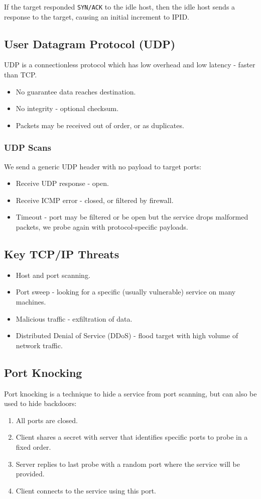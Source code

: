 \documentclass[11pt]{article}
\begin{document}
If the target responded \texttt{SYN/ACK} to the idle host, then the idle host sends a response to the target, causing an initial increment to IPID.

\subsection{User Datagram Protocol (UDP)}
UDP is a connectionless protocol which has low overhead and low latency - faster than TCP.
\begin{itemize}
  \item No guarantee data reaches destination.
  \item No integrity - optional checksum.
  \item Packets may be received out of order, or as duplicates.
\end{itemize}

\subsubsection{UDP Scans}
We send a generic UDP header with no payload to target ports:
\begin{itemize}
  \item Receive UDP response - open.
  \item Receive ICMP error - closed, or filtered by firewall.
  \item Timeout - port may be filtered or be open but the service drops malformed packets, we probe again with protocol-specific payloads.
\end{itemize}

\subsection{Key TCP/IP Threats}
\begin{itemize}
  \item Host and port scanning.
  \item Port sweep - looking for a specific (usually vulnerable) service on many machines.
  \item Malicious traffic - exfiltration of data.
  \item Distributed Denial of Service (DDoS) - flood target with high volume of network traffic.
\end{itemize}

\subsection{Port Knocking}
Port knocking is a technique to hide a service from port scanning, but can also be used to hide backdoors:
\begin{enumerate}
  \item All ports are closed.
  \item Client shares a secret with server that identifies specific ports to probe in a fixed order.
  \item Server replies to last probe with a random port where the service will be provided.
  \item Client connects to the service using this port.
\end{enumerate}
\end{document}
